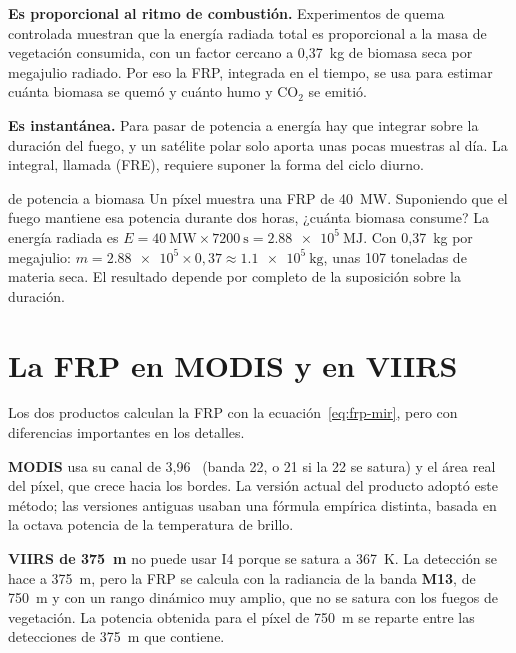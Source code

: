 \textbf{Es proporcional al ritmo de combustión.} Experimentos de quema controlada muestran que
la energía radiada total es proporcional a la masa de vegetación consumida, con un factor
cercano a 0,37~kg de biomasa seca por megajulio radiado. Por eso la FRP, integrada en el tiempo,
se usa para estimar cuánta biomasa se quemó y cuánto humo y CO$_2$ se emitió.

\textbf{Es instantánea.} Para pasar de potencia a energía hay que integrar sobre la duración del
fuego, y un satélite polar solo aporta unas pocas muestras al día. La integral, llamada
 (FRE), requiere suponer la forma del ciclo diurno.

\begin{ejemplo}{de potencia a biomasa}
Un píxel muestra una FRP de 40~MW. Suponiendo que el fuego mantiene esa potencia durante dos
horas, ¿cuánta biomasa consume?
\solucion La energía radiada es $E = \SI{40}{\mega\watt}\times\SI{7200}{\second} =
\SI{2.88e5}{\mega\joule}$. Con 0,37~kg por megajulio: $m = \num{2.88e5}\times 0{,}37 \approx
\SI{1.1e5}{\kilo\gram}$, unas 107 toneladas de materia seca. El resultado depende por completo
de la suposición sobre la duración.
\end{ejemplo}

\section{La FRP en MODIS y en VIIRS}

Los dos productos calculan la FRP con la ecuación~\eqref{eq:frp-mir}, pero con diferencias
importantes en los detalles.

\textbf{MODIS} usa su canal de 3,96~\um{} (banda 22, o 21 si la 22 se satura) y el área real del
píxel, que crece hacia los bordes. La versión actual del producto adoptó este método; las
versiones antiguas usaban una fórmula empírica distinta, basada en la octava potencia de la
temperatura de brillo.

\textbf{VIIRS de 375~m} no puede usar I4 porque se satura a 367~K. La detección se hace a
375~m, pero la FRP se calcula con la radiancia de la banda \textbf{M13}, de 750~m y con un rango
dinámico muy amplio, que no se satura con los fuegos de vegetación. La potencia obtenida para el
píxel de 750~m se reparte entre las detecciones de 375~m que contiene.

